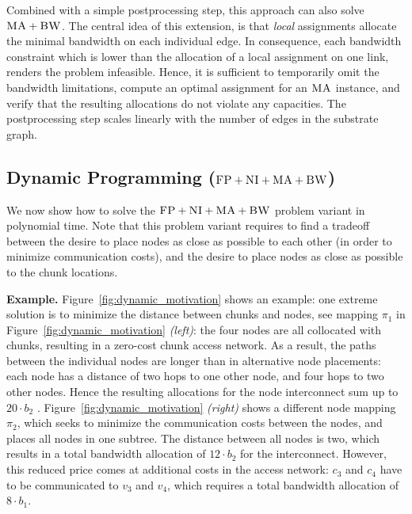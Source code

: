\documentclass[9pt]{sigcomm-alternate}
\newcommand{\NodeMapping}{\pi}
\newcommand{\CC}{\textsc{NI}}
\newcommand{\FP}{\textsc{FP}}
\newcommand{\BW}{\textsc{BW}}
\newcommand{\MA}{\textsc{MA}}
\newcommand{\CostTrans}{\ensuremath{b_1}}
\newcommand{\CostCom}{\ensuremath{b_2}}
\begin{document}
Combined with a simple postprocessing step, this approach can also solve $\MA+\BW$. The central idea of this extension, is
that \emph{local} assignments allocate the minimal bandwidth
on each individual edge. In consequence, each bandwidth constraint
which is lower than the allocation of a local assignment on one link, renders
the problem infeasible. Hence, it is sufficient to temporarily omit the
bandwidth limitations, compute an optimal assignment for an $\MA$ instance, and
verify that the resulting allocations do not violate any capacities. The
postprocessing step scales linearly with the number of edges in the substrate
graph.



\subsection{Dynamic Programming ($\FP+\CC+\MA+\BW$)}\label{ssec:dyn}

We now show how to solve the $\FP+\CC+\MA+\BW$ problem variant
in polynomial time.
Note that this problem variant requires to find a
tradeoff between the desire to place nodes as close as possible to each other
(in order to minimize communication costs), and the desire to place nodes
as close as possible to
the chunk locations.

\textbf{Example.} Figure~\ref{fig:dynamic_motivation} shows an example: one
extreme solution is to minimize the distance between chunks and nodes,
see mapping $\NodeMapping_1$ in
Figure~\ref{fig:dynamic_motivation} \emph{(left)}: the four nodes are all
collocated with chunks, resulting in a zero-cost chunk access network. As a
result, the paths between the individual nodes are longer than in alternative
node placements: each node has a distance of two hops to one other node,
and four hops to two other nodes. Hence the resulting allocations for the
node interconnect sum up to $20 \cdot \CostCom$ .
Figure~\ref{fig:dynamic_motivation} \emph{(right)} shows a different node
mapping $\NodeMapping_2$, which seeks to minimize the communication costs
between the nodes, and places all nodes in one subtree. The distance between all
nodes is two, which results in a total bandwidth allocation of $12\cdot\CostCom$
for the interconnect. However, this reduced price comes at additional costs in
the access network: $c_3$ and $c_4$ have to be communicated to $v_3$ and $v_4$,
which requires a total bandwidth allocation of $8 \cdot \CostTrans$.
\end{document}
